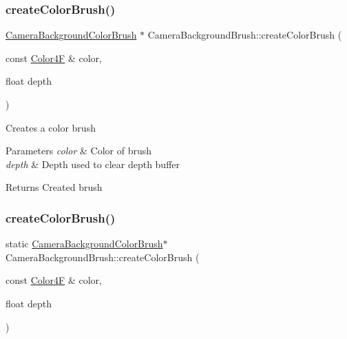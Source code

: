 \subsubsection{\texorpdfstring{create\+Color\+Brush()}{createColorBrush()}\hspace{0.1cm}{\footnotesize\ttfamily [1/2]}}
{\footnotesize\ttfamily \hyperlink{classCameraBackgroundColorBrush}{Camera\+Background\+Color\+Brush} $\ast$ Camera\+Background\+Brush\+::create\+Color\+Brush (\begin{DoxyParamCaption}\item[{const \hyperlink{structColor4F}{Color4F} \&}]{color,  }\item[{float}]{depth }\end{DoxyParamCaption})\hspace{0.3cm}{\ttfamily [static]}}

Creates a color brush 
\begin{DoxyParams}{Parameters}
{\em color} & Color of brush \\
\hline
{\em depth} & Depth used to clear depth buffer \\
\hline
\end{DoxyParams}
\begin{DoxyReturn}{Returns}
Created brush 
\end{DoxyReturn}
\mbox{\label{classCameraBackgroundBrush_a95b4bf3f41a14015bbce424cc2f92952}} 
\subsubsection{\texorpdfstring{create\+Color\+Brush()}{createColorBrush()}\hspace{0.1cm}{\footnotesize\ttfamily [2/2]}}
{\footnotesize\ttfamily static \hyperlink{classCameraBackgroundColorBrush}{Camera\+Background\+Color\+Brush}$\ast$ Camera\+Background\+Brush\+::create\+Color\+Brush (\begin{DoxyParamCaption}\item[{const \hyperlink{structColor4F}{Color4F} \&}]{color,  }\item[{float}]{depth }\end{DoxyParamCaption})\hspace{0.3cm}{\ttfamily [static]}}

